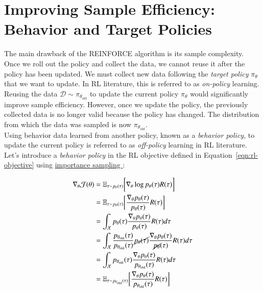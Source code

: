 \section{Improving Sample Efficiency: Behavior and Target Policies}


The main drawback of the REINFORCE algorithm is its sample complexity. Once we roll out the policy and collect the data, we cannot reuse it after the policy has been updated. We must collect new data following the \textit{target policy} $\pi_{\theta}$ that we want to update. In RL literature, this is referred to as \textit{on-policy} learning. Reusing the data $\mathcal{D}\sim\pi_{\theta_{\text{old}}}$ to update the current policy $\pi_{\theta}$ would significantly improve sample efficiency. However, once we update the policy, the previously collected data is no longer valid because the policy has changed. The distribution from which the data was sampled is now $\pi_{\theta_{\text{old}}}$. \\

\noindent Using behavior data learned from another policy, known as a \textit{behavior policy}, to update the current policy is referred to as \textit{off-policy} learning in RL literature. Let's introduce a \textit{behavior policy} in the RL objective defined in Equation~\ref{eqn:rl-objective} using \href{https://timvieira.github.io/blog/post/2014/12/21/importance-sampling/}{importance sampling
}:

\begin{equation}\label{eqn:derive-rl-objective-with-is}
    \begin{split}
        \nabla_{\theta}\mathcal{J}(\theta) &= \mathbb{E}_{\tau \sim p_{\theta}(\tau)}\bigg[ \nabla_{\theta}\log p_{\theta}(\tau) R(\tau)\bigg] \\
        &= \mathbb{E}_{\tau \sim p_{\theta}(\tau)} \bigg[ \frac{\nabla_{\theta}p_{\theta}(\tau)}{p_{\theta}(\tau)} R(\tau) \bigg] \\
        &= \int_{\mathcal{X}} p_{\theta}(\tau) \frac{\nabla_{\theta}p_{\theta}(\tau)}{p_{\theta}(\tau)} R(\tau) d\tau \\
        &= \int_{\mathcal{X}} \frac{p_{\theta_{\text{old}}}(\tau)}{p_{\theta_{\text{old}}}(\tau)} \cancel{p_{\theta}(\tau)} \frac{\nabla_{\theta}p_{\theta}(\tau)}{\cancel{p_{\theta}}(\tau)} R(\tau) d\tau \\
        &= \int_{\mathcal{X}} p_{\theta_{\text{old}}}(\tau) \frac{\nabla_{\theta}p_{\theta}(\tau)}{p_{\theta_{\text{old}}}(\tau)} R(\tau) d\tau \\
        &= \mathbb{E}_{\tau\sim p_{\theta_{\text{old}}}(\tau)} \bigg[\frac{\nabla_{\theta} p_{\theta}(\tau)}{p_{\theta_{\text{old}}}(\tau)} R(\tau)\bigg]
    \end{split}
\end{equation}

